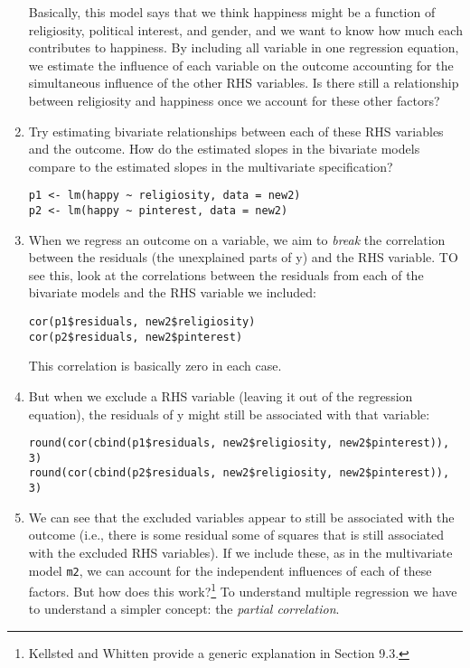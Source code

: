 \documentclass[a4paper,12pt]{article}
\begin{document}
\begin{enumerate}
\noindent Basically, this model says that we think happiness might be a function of religiosity, political interest, and gender, and we want to know how much each contributes to happiness. By including all variable in one regression equation, we estimate the influence of each variable on the outcome accounting for the simultaneous influence of the other RHS variables. Is there still a relationship between religiosity and happiness once we account for these other factors?

\item Try estimating bivariate relationships between each of these RHS variables and the outcome. How do the estimated slopes in the bivariate models compare to the estimated slopes in the multivariate specification?

\begin{verbatim}
p1 <- lm(happy ~ religiosity, data = new2)
p2 <- lm(happy ~ pinterest, data = new2)
\end{verbatim}

\item When we regress an outcome on a variable, we aim to \textit{break} the correlation between the residuals (the unexplained parts of y) and the RHS variable. TO see this, look at the correlations between the residuals from each of the bivariate models and the RHS variable we included:

\begin{verbatim}
cor(p1$residuals, new2$religiosity)
cor(p2$residuals, new2$pinterest)
\end{verbatim}

\noindent This correlation is basically zero in each case.

\item But when we exclude a RHS variable (leaving it out of the regression equation), the residuals of y might still be associated with that variable:

\begin{verbatim}
round(cor(cbind(p1$residuals, new2$religiosity, new2$pinterest)), 3)
round(cor(cbind(p2$residuals, new2$religiosity, new2$pinterest)), 3)
\end{verbatim}

\item We can see that the excluded variables appear to still be associated with the outcome (i.e., there is some residual some of squares that is still associated with the excluded RHS variables). If we include these, as in the multivariate model \texttt{m2}, we can account for the independent influences of each of these factors. But how does this work?\footnote{Kellsted and Whitten provide a generic explanation in Section 9.3.} To understand multiple regression we have to understand a simpler concept: the \textit{partial correlation}.


\end{enumerate}
\end{document}
